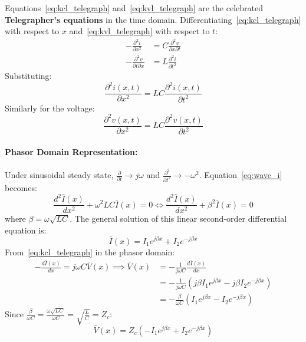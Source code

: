 Equations~\eqref{eq:kcl_telegraph} and~\eqref{eq:kvl_telegraph} are the celebrated \textbf{Telegrapher's equations} in the time domain.
Differentiating~\eqref{eq:kcl_telegraph} with respect to $x$ and~\eqref{eq:kvl_telegraph} with respect to $t$:
\begin{align}
    -\frac{\partial^2 i}{\partial x^2} &= C \frac{\partial^2 v}{\partial x \partial t} \\
    -\frac{\partial^2 v}{\partial t \partial x} &= L \frac{\partial^2 i}{\partial t^2}
\end{align}
Substituting:
\begin{equation}
    \boxed{\frac{\partial^2 i(x, t)}{\partial x^2} = L C \frac{\partial^2 i(x, t)}{\partial t^2}} \label{eq:wave_i}
\end{equation}
Similarly for the voltage:
\begin{equation}
    \boxed{\frac{\partial^2 v(x, t)}{\partial x^2} = L C \frac{\partial^2 v(x, t)}{\partial t^2}} \label{eq:wave_v}
\end{equation}

\paragraph{Phasor Domain Representation:}
Under sinusoidal steady state, $\frac{\partial}{\partial t} \to j\omega$ and $\frac{\partial^2}{\partial t^2} \to -\omega^2$. Equation~\eqref{eq:wave_i} becomes:
\begin{equation}
    \frac{d^2 \bar{I}(x)}{dx^2} + \omega^2 L C \bar{I}(x) = 0 \iff \frac{d^2 \bar{I}(x)}{dx^2} + \beta^2 \bar{I}(x) = 0 \label{eq:phasor_diff_eq}
\end{equation}
where $\beta = \omega\sqrt{LC}$. The general solution of this linear second-order differential equation is:
\begin{equation}
    \bar{I}(x) = I_1 e^{j \beta x} + I_2 e^{-j \beta x} \label{eq:I_general}
\end{equation}
From~\eqref{eq:kcl_telegraph} in the phasor domain:
\begin{align}
    -\frac{d\bar{I}(x)}{dx} = j\omega C \bar{V}(x) \implies \bar{V}(x) &= -\frac{1}{j\omega C} \frac{d\bar{I}(x)}{dx} \nonumber\\
    &= -\frac{1}{j\omega C} \left( j\beta I_1 e^{j\beta x} - j\beta I_2 e^{-j\beta x} \right) \nonumber\\
    &= -\frac{\beta}{\omega C} \left( I_1 e^{j\beta x} - I_2 e^{-j\beta x} \right)
\end{align}
Since $\frac{\beta}{\omega C} = \frac{\omega\sqrt{LC}}{\omega C} = \sqrt{\frac{L}{C}} = Z_c$:
\begin{equation}
    \bar{V}(x) = Z_c \left( -I_1 e^{j\beta x} + I_2 e^{-j\beta x} \right) \label{eq:V_general}
\end{equation}

